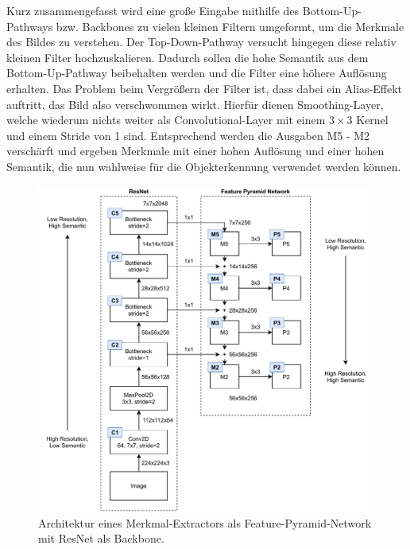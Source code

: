 Kurz zusammengefasst wird eine große Eingabe mithilfe des Bottom-Up-Pathways
bzw. Backbones zu vielen kleinen Filtern umgeformt, um die Merkmale des Bildes
zu verstehen. Der Top-Down-Pathway versucht hingegen diese relativ kleinen Filter hochzuskalieren. Dadurch sollen die hohe Semantik aus dem Bottom-Up-Pathway beibehalten werden und die Filter eine höhere Auflösung erhalten. Das Problem beim
Vergrößern der Filter ist, dass dabei ein Alias-Effekt auftritt, das Bild also
verschwommen wirkt. Hierfür dienen Smoothing-Layer, welche wiederum nichts
weiter als Convolutional-Layer mit einem $3 \times 3$ Kernel und einem Stride
von 1 sind. Entsprechend werden die Ausgaben M5 - M2 verschärft und ergeben
Merkmale mit einer hohen Auflösung und einer hohen Semantik, die nun wahlweise
für die Objekterkennung verwendet werden können.

\begin{figure}
    \includegraphics[width=\textwidth]{images/ResNet_FPN.pdf}
    \caption{Architektur eines Merkmal-Extractors als Feature-Pyramid-Network
    mit ResNet als Backbone.}
    \label{fig:resnet-fpn}
\end{figure}

